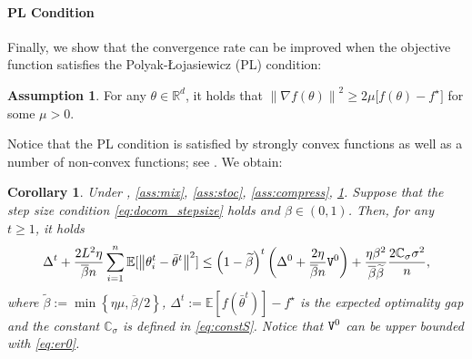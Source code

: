 \documentclass[10pt]{article} %
\theoremstyle{plain}
\newtheorem{corollary}[theorem]{Corollary}
\theoremstyle{definition}
\newtheorem{assumption}[theorem]{Assumption}
\theoremstyle{remark}
\newcommand{\prm}{\theta}
\newcommand{\avgtheta}{\bar{\prm}}
\newcommand{\norm}[1]{\left\| #1 \right\|}
\newcommand{\ER}{{\tt V}}
\newcommand{\ConstS}{\mathbb{C}_\sigma}
\newcommand{\InitG}{\overline{G}_0}
\newcommand{\brho}{\overline{\beta}}
\newcommand{\bmu}{\widetilde{\beta}}
\begin{document}
\paragraph{PL Condition} Finally, we show that the convergence rate can be improved when the objective function satisfies the Polyak-Łojasiewicz (PL) condition: 
\begin{assumption} \label{ass:pl}
    For any $\prm \in \mathbb{R}^d$, it holds that $\norm{ \nabla f( \prm ) }^2 \geq 2 \mu \big[ f( \prm ) - f^\star \big]$ for some $\mu > 0$.
\end{assumption}
\vspace{-.0cm}
Notice that the PL condition is satisfied by strongly convex functions as well as a number of non-convex functions; see \cite{karimi2016linear}. We obtain:

\begin{tcolorbox}
\begin{corollary} \label{cor:pl}
Under , \ref{ass:mix}, \ref{ass:stoc}, \ref{ass:compress}, \ref{ass:pl}. Suppose that the step size condition \eqref{eq:docom_stepsize} holds and $\beta \in (0,1)$. Then, for any $t \geq 1$, it holds
\begin{equation}
    \Delta^{t} + \frac{2 L^2 \eta}{\brho n} \sum_{i=1}^n \mathbb{E} [ \norm{\theta_i^t - \avgtheta^t}^2 ] \leq \left( 1 - \bmu \right)^t \left( \Delta^0 + \frac{2 \eta}{ \brho n } \ER^0 \right)  + \frac{ \eta \beta^2 }{ \brho  \bmu } \frac{2 \ConstS \sigma^2}{n} , \label{eq:plcase}
\end{equation}
where $\bmu := \min \left\{ \eta \mu, { \brho } / {2} \right\}$, $\Delta^t := \mathbb{E} [ f( \avgtheta^t )] - f^\star$ is the expected optimality gap and the constant $\ConstS$ is defined in \eqref{eq:constS}. Notice that $\ER^0$ can be upper bounded with \eqref{eq:er0}.
\end{corollary}
\end{tcolorbox}
\end{document}
